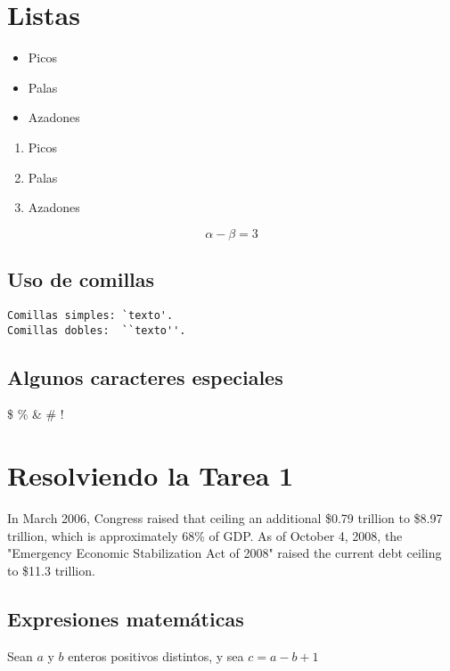\documentclass[12pt,a4paper]{article}
\begin{document}
\section*{Listas}

\begin{itemize}
\item Picos
\item Palas
\item Azadones
\end{itemize}

\begin{enumerate}
\item Picos
\item Palas
\item Azadones
\end{enumerate}

\begin{equation}
\alpha - \beta = 3
\end{equation}

\subsection*{Uso de comillas}

\begin{verbatim}
Comillas simples: `texto'.
Comillas dobles:  ``texto''.
\end{verbatim}

\subsection*{Algunos caracteres especiales}

\$ \% \& \# !

\section*{Resolviendo la Tarea 1}

In March 2006, Congress raised that ceiling an 
additional \$0.79 trillion to \$8.97 trillion,
which is approximately 68\% of GDP. As of October
4, 2008, the "Emergency Economic Stabilization
Act of 2008" raised the current debt ceiling
to \$11.3 trillion.


\subsection*{Expresiones matemáticas}

Sean $a$ y $b$ enteros positivos distintos, y sea $c = a - b +1$
\end{document}

